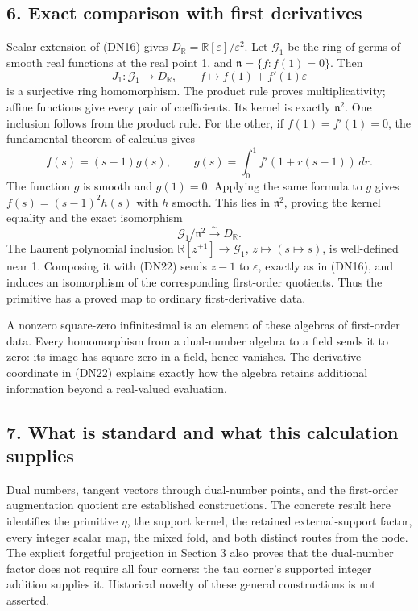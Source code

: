 \documentclass[
]{article}
\begin{document}
\subsection{6. Exact comparison with first
derivatives}\label{exact-comparison-with-first-derivatives}

Scalar extension of (DN16) gives
\(D_{\mathbb R}=\mathbb R[\varepsilon]/\varepsilon^2\). Let
\(\mathcal G_1\) be the ring of germs of smooth real functions at the
real point 1, and \(\mathfrak n=\{f:f(1)=0\}\). Then \[
J_1:\mathcal G_1\longrightarrow D_{\mathbb R},
\qquad f\longmapsto f(1)+f'(1)\varepsilon
\tag{DN22}
\] is a surjective ring homomorphism. The product rule proves
multiplicativity; affine functions give every pair of coefficients. Its
kernel is exactly \(\mathfrak n^2\). One inclusion follows from the
product rule. For the other, if \(f(1)=f'(1)=0\), the fundamental
theorem of calculus gives \[
f(s)=(s-1)g(s),\qquad
g(s)=\int_0^1 f'(1+r(s-1))\,dr.
\] The function \(g\) is smooth and \(g(1)=0\). Applying the same
formula to \(g\) gives \(f(s)=(s-1)^2h(s)\) with \(h\) smooth. This lies
in \(\mathfrak n^2\), proving the kernel equality and the exact
isomorphism \[
\mathcal G_1/\mathfrak n^2\xrightarrow{\sim}D_{\mathbb R}.
\tag{DN23}
\] The Laurent polynomial inclusion
\(\mathbb R[z^{\pm1}]\to\mathcal G_1\), \(z\mapsto(s\mapsto s)\), is
well-defined near 1. Composing it with (DN22) sends \(z-1\) to
\(\varepsilon\), exactly as in (DN16), and induces an isomorphism of the
corresponding first-order quotients. Thus the primitive has a proved map
to ordinary first-derivative data.

A nonzero square-zero infinitesimal is an element of these algebras of
first-order data. Every homomorphism from a dual-number algebra to a
field sends it to zero: its image has square zero in a field, hence
vanishes. The derivative coordinate in (DN22) explains exactly how the
algebra retains additional information beyond a real-valued evaluation.

\subsection{7. What is standard and what this calculation
supplies}\label{what-is-standard-and-what-this-calculation-supplies}

Dual numbers, tangent vectors through dual-number points, and the
first-order augmentation quotient are established constructions. The
concrete result here identifies the primitive \(\eta\), the support
kernel, the retained external-support factor, every integer scalar map,
the mixed fold, and both distinct routes from the node. The explicit
forgetful projection in Section 3 also proves that the dual-number
factor does not require all four corners: the tau corner's supported
integer addition supplies it. Historical novelty of these general
constructions is not asserted.
\end{document}

